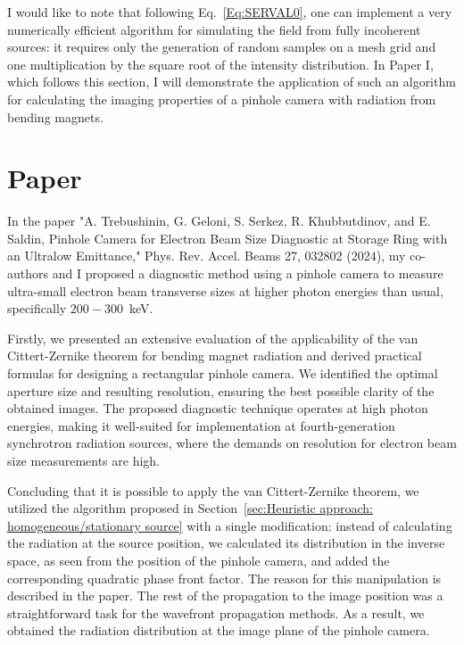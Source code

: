     I would like to note that following Eq.~\ref{Eq:SERVAL0}, one can implement a very numerically efficient algorithm for simulating the field from fully incoherent sources: it requires only the generation of random samples on a mesh grid and one multiplication by the square root of the intensity distribution. In Paper I, which follows this section, I will demonstrate the application of such an algorithm for calculating the imaging properties of a pinhole camera with radiation from bending magnets. 
    
\newpage   
\setcounter{mycounter}{1}
\section{Paper }

    In the paper "A. Trebushinin, G. Geloni, S. Serkez, R. Khubbutdinov, and E. Saldin, Pinhole Camera for Electron Beam Size Diagnostic at Storage Ring with an Ultralow Emittance," Phys. Rev. Accel. Beams 27, 032802 (2024), my co-authors and I proposed a diagnostic method using a pinhole camera to measure ultra-small electron beam transverse sizes at higher photon energies than usual, specifically $200-300$~keV.
    
    Firstly, we presented an extensive evaluation of the applicability of the van Cittert-Zernike theorem for bending magnet radiation and derived practical formulas for designing a rectangular pinhole camera. We identified the optimal aperture size and resulting resolution, ensuring the best possible clarity of the obtained images. The proposed diagnostic technique operates at high photon energies, making it well-suited for implementation at fourth-generation synchrotron radiation sources, where the demands on resolution for electron beam size measurements are high.
    
    Concluding that it is possible to apply the van Cittert-Zernike theorem, we utilized the algorithm proposed in Section~\ref{sec:Heuristic approach: homogeneous/stationary source} with a single modification: instead of calculating the radiation at the source position, we calculated its distribution in the inverse space, as seen from the position of the pinhole camera, and added the corresponding quadratic phase front factor. The reason for this manipulation is described in the paper. The rest of the propagation to the image position was a straightforward task for the wavefront propagation methods. As a result, we obtained the radiation distribution at the image plane of the pinhole camera.
    
